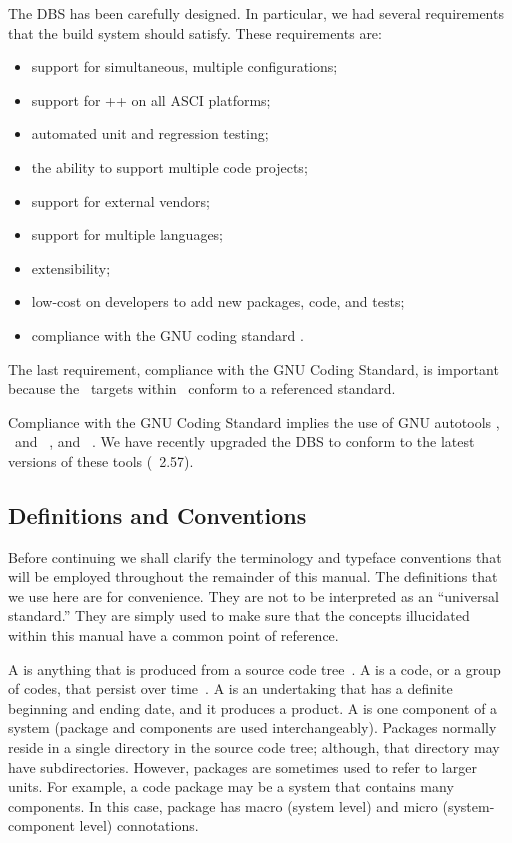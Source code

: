 The DBS has been carefully designed.  In particular, we had several
requirements that the build system should satisfy.  These requirements
are:
\begin{itemize}
\item support for simultaneous, multiple configurations;
\item support for \C++ on all ASCI platforms;
\item automated unit and regression testing;
\item the ability to support multiple code projects;
\item support for external vendors;
\item support for multiple languages;
\item extensibility;
\item low-cost on developers to add new packages, code, and tests; 
\item compliance with the GNU coding standard \cite{gnu} .
\end{itemize}
The last requirement, compliance with the GNU Coding Standard, is
important because the \make\ targets within \draco\ conform to a
referenced standard.

Compliance with the GNU Coding Standard implies the use of GNU
autotools , \autoconf\ and
\automake~\cite{autoconf}, and \make~\cite{gmake}.  We have recently
upgraded the DBS to conform to the latest versions of these tools
(\autoconf\ 2.57).


\subsection{Definitions and Conventions}

Before continuing we shall clarify the terminology and typeface
conventions that will be employed throughout the remainder of this
manual.  The definitions that we use here are for convenience.  They
are not to be interpreted as an ``universal standard.''  They are
simply used to make sure that the concepts illucidated within this
manual have a common point of reference.

A  is anything that is produced from a source code
tree~\cite{ja94}.  A  is a code, or a group of codes,
that persist over time~\cite{tn98}.  A  is an
undertaking that has a definite beginning and ending date, and it
produces a product.  A  is one component of a system
(package and components are used interchangeably).  Packages normally
reside in a single directory in the source code tree; although, that
directory may have subdirectories.  However, packages are sometimes
used to refer to larger units.  For example, a code package may be a
system that contains many components.  In this case, package has macro
(system level) and micro (system-component level) connotations.

